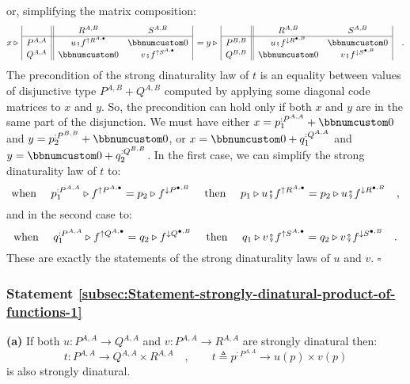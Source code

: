 or, simplifying the matrix composition:
\[
x\triangleright\,\begin{array}{|c||cc|}
 & R^{A,B} & S^{A,B}\\
\hline P^{A,A} & u\bef f^{\uparrow R^{A,\bullet}} & \bbnum 0\\
Q^{A,A} & \bbnum 0 & v\bef f^{\uparrow S^{A,\bullet}}
\end{array}\,=y\triangleright\,\begin{array}{|c||cc|}
 & R^{A,B} & S^{A,B}\\
\hline P^{B,B} & u\bef f^{\downarrow R^{\bullet,B}} & \bbnum 0\\
Q^{B,B} & \bbnum 0 & v\bef f^{\downarrow S^{\bullet,B}}
\end{array}\quad.
\]
The precondition of the strong dinaturality law of $t$ is an equality
between values of disjunctive type $P^{A,B}+Q^{A,B}$ computed by
applying some diagonal code matrices to $x$ and $y$. So, the precondition
can hold only if both $x$ and $y$ are in the same part of the disjunction.
We must have either $x=p_{1}^{:P^{A,A}}+\bbnum 0$ and $y=p_{2}^{:P^{B,B}}+\bbnum 0$,
or $x=\bbnum 0+q_{1}^{:Q^{A,A}}$ and $y=\bbnum 0+q_{2}^{:Q^{B,B}}$.
In the first case, we can simplify the strong dinaturality law of
$t$ to:
\[
\text{when }\quad p_{1}^{:P^{A,A}}\triangleright f^{\uparrow P^{A,\bullet}}=p_{2}\triangleright f^{\downarrow P^{\bullet,B}}\quad\text{ then }\quad p_{1}\triangleright u\bef f^{\uparrow R^{A,\bullet}}=p_{2}\triangleright u\bef f^{\downarrow R^{\bullet,B}}\quad,
\]
and in the second case to:
\[
\text{when }\quad q_{1}^{:P^{A,A}}\triangleright f^{\uparrow Q^{A,\bullet}}=q_{2}\triangleright f^{\downarrow Q^{\bullet,B}}\quad\text{ then }\quad q_{1}\triangleright v\bef f^{\uparrow S^{A,\bullet}}=q_{2}\triangleright v\bef f^{\downarrow S^{\bullet,B}}\quad.
\]
These are exactly the statements of the strong dinaturality laws of
$u$ and $v$. $\square$

\subsubsection{Statement \label{subsec:Statement-strongly-dinatural-product-of-functions-1}\ref{subsec:Statement-strongly-dinatural-product-of-functions-1}}

\textbf{(a)} If both $u:P^{A,A}\rightarrow Q^{A,A}$ and $v:P^{A,A}\rightarrow R^{A,A}$
are strongly dinatural then:
\[
t:P^{A,A}\rightarrow Q^{A,A}\times R^{A,A}\quad,\quad\quad t\triangleq p^{:P^{A,A}}\rightarrow u(p)\times v(p)
\]
is also strongly dinatural. 


